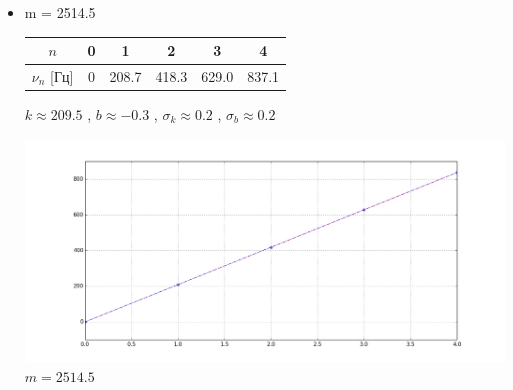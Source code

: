 \documentclass[8pt]{article}
\begin{document}
\begin{itemize}
\begin{center}
            \end{center}
        \item m = 2514.5
                    \begin{center}
                    \begin{tabular}{|c|c|c|c|c|c|}
                            \hline 
                                $n$ & 0 & 1 & 2 & 3 & 4  \\
                            \hline
                                $\nu_n$ [Гц] &0&208.7&418.3&629.0&837.1\\
                            \hline
                    \end{tabular}
                    \end{center}
            $k \approx 209.5$  , $b \approx -0.3$ , $\sigma_k \approx 0.2$ , $\sigma_b \approx 0.2$ \\
            \begin{center} 
                \includegraphics[width=5in]{m4.png} \\ \tiny{$m = 2514.5$}
            \end{center}
    \end{itemize}
    
\end{document}
